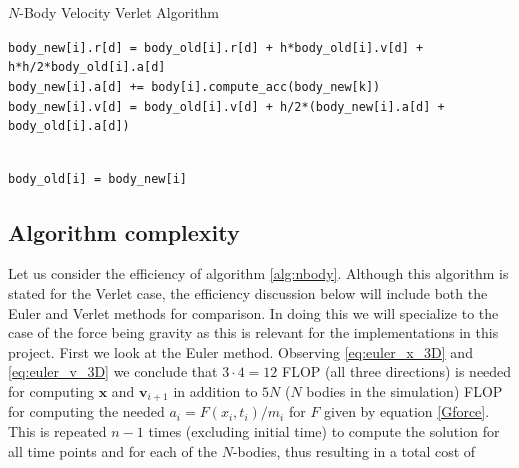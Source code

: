\documentclass[12pt]{article}
\numberwithin{figure}{section}
\numberwithin{table}{section}
\begin{document}
\begin{algorithm}
\caption{$N$-Body Velocity Verlet Algorithm} \label{alg:nbody}
\begin{algorithmic}[1]
        	\State \texttt{body\_new[i].r[d] = body\_old[i].r[d] + h*body\_old[i].v[d] + h*h/2*body\_old[i].a[d]}
        \EndFor
    \EndFor \\
    
            	\State \texttt{body\_new[i].a[d] += body[i].compute\_acc(body\_new[k])}
            \EndFor \\
            
            \State \texttt{body\_new[i].v[d] = body\_old[i].v[d] + h/2*(body\_new[i].a[d] + body\_old[i].a[d])}
        	
        \EndFor \\
        
        	\State \texttt{body\_old[i] = body\_new[i]}
        \EndFor
    \EndFor
  \EndWhile
\EndProcedure
\end{algorithmic}
\end{algorithm}


\subsection{Algorithm complexity} \label{sec:complexity}
Let us consider the efficiency of algorithm \ref{alg:nbody}. Although this algorithm is stated for the Verlet case, the efficiency discussion below will include both the Euler and Verlet methods for comparison. In doing this we will specialize to the case of the force being gravity as this is relevant for the implementations in this project. First we look at the Euler method. Observing \eqref{eq:euler_x_3D} and \eqref{eq:euler_v_3D} we conclude that $3\cdot 4=12$ FLOP (all three directions) is needed for computing $\mathbf{x}$ and $\mathbf{v}_{i+1}$ in addition to $5N$ ($N$ bodies in the simulation) FLOP for computing the needed $a_i=F(x_i,t_i)/m_i$ for $F$ given by equation \eqref{Gforce}. This is repeated $n-1$ times (excluding initial time) to compute the solution for all time points and for each of the $N$-bodies, thus resulting in a total cost of
\end{document}
